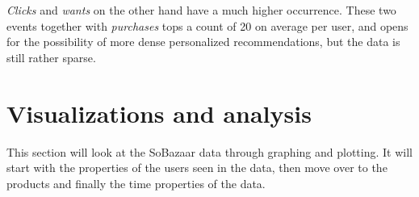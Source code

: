     \emph{Clicks} and \emph{wants} on the other hand have a much higher occurrence. These two events together with \emph{purchases} tops a count of 20 on average per user, and opens for the possibility of more dense personalized recommendations, but the data is still rather sparse.

\section{Visualizations and analysis}
    This section will look at the SoBazaar data through graphing and plotting.
    It will start with the properties of the users seen in the data, then move over to the products and finally the time properties of the data.

